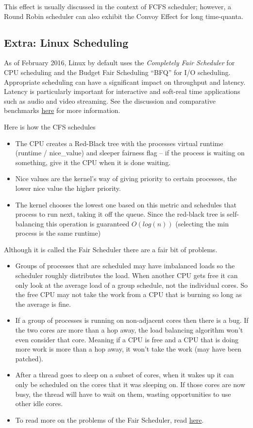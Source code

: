 This effect is usually discussed in the context of FCFS scheduler; however, a Round Robin scheduler can also exhibit the Convoy Effect for long time-quanta.

\subsection{Extra: Linux Scheduling}

As of February 2016, Linux by default uses the \emph{Completely Fair Scheduler} for CPU scheduling and the Budget Fair Scheduling ``BFQ'' for I/O scheduling. Appropriate scheduling can have a significant impact on throughput and latency. Latency is particularly important for interactive and soft-real time applications such as audio and video streaming. See the discussion and comparative benchmarks \href{https://lkml.org/lkml/2014/5/27/314}{here} for more information.

Here is how the CFS schedules

\begin{itemize}
\tightlist
\item
  The CPU creates a Red-Black tree with the processes virtual runtime (runtime / nice\_value) and sleeper fairness flag -- if the process is waiting on something, give it the CPU when it is done waiting.
\item
  Nice values are the kernel's way of giving priority to certain processes, the lower nice value the higher priority.
\item
  The kernel chooses the lowest one based on this metric and schedules that process to run next, taking it off the queue. Since the red-black tree is self-balancing this operation is guaranteed \(O(log(n))\) (selecting the min process is the same runtime)
\end{itemize}

Although it is called the Fair Scheduler there are a fair bit of problems.

\begin{itemize}
\tightlist
\item
  Groups of processes that are scheduled may have imbalanced loads so the scheduler roughly distributes the load. When another CPU gets free it can only look at the average load of a group schedule, not the individual cores. So the free CPU may not take the work from a CPU that is burning so long as the average is fine.
\item
  If a group of processes is running on non-adjacent cores then there is a bug. If the two cores are more than a hop away, the load balancing algorithm won't even consider that core. Meaning if a CPU is free and a CPU that is doing more work is more than a hop away, it won't take the work (may have been patched).
\item
  After a thread goes to sleep on a subset of cores, when it wakes up it can only be scheduled on the cores that it was sleeping on. If those cores are now busy, the thread will have to wait on them, wasting opportunities to use other idle cores.
\item
  To read more on the problems of the Fair Scheduler, read \href{https://blog.acolyer.org/2016/04/26/the-linux-scheduler-a-decade-of-wasted-cores}{here}.
\end{itemize}

